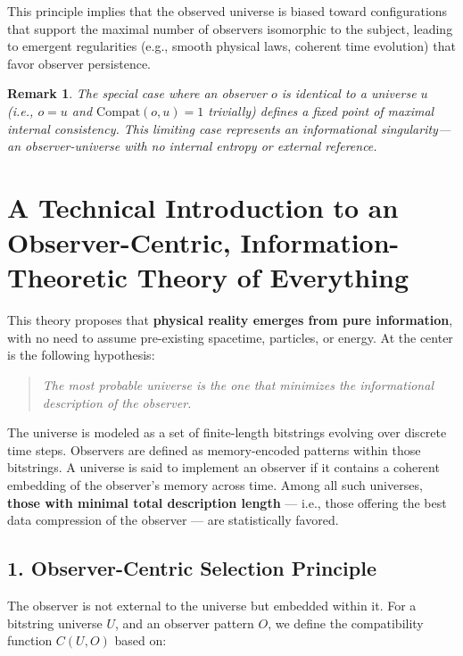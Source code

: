 \documentclass[11pt]{article}
\newtheorem{remark}{Remark}
\begin{document}
This principle implies that the observed universe is biased toward configurations that support the maximal number of observers isomorphic to the subject, leading to emergent regularities (e.g., smooth physical laws, coherent time evolution) that favor observer persistence.

\begin{remark}
      The special case where an observer $o$ is identical to a universe $u$ (i.e., $o = u$ and $\mathrm{Compat}(o, u) = 1$ trivially) defines a fixed point of maximal internal consistency. This limiting case represents an informational singularity—an observer-universe with no internal entropy or external reference.
\end{remark}



\section*{A Technical Introduction to an Observer-Centric, Information-Theoretic Theory of Everything}

This theory proposes that \textbf{physical reality emerges from pure information}, with no need to assume pre-existing spacetime, particles, or energy. At the center is the following hypothesis:

\begin{quote}
      \textit{The most probable universe is the one that minimizes the informational description of the observer.}
\end{quote}

The universe is modeled as a set of finite-length bitstrings evolving over discrete time steps. Observers are defined as memory-encoded patterns within those bitstrings. A universe is said to implement an observer if it contains a coherent embedding of the observer’s memory across time. Among all such universes, \textbf{those with minimal total description length} — i.e., those offering the best data compression of the observer — are statistically favored.

\subsection*{1. Observer-Centric Selection Principle}

The observer is not external to the universe but embedded within it. For a bitstring universe $U$, and an observer pattern $O$, we define the compatibility function $C(U, O)$ based on:
\end{document}
